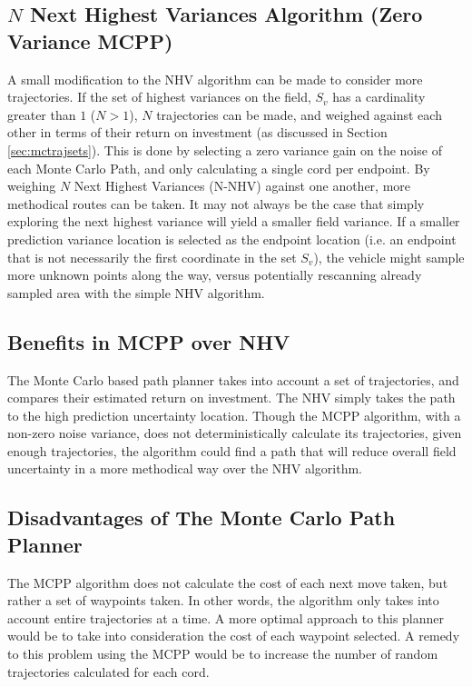 \subsection{$N$ Next Highest Variances Algorithm (Zero Variance MCPP)} \label{sec:nnhv}
A small modification to the NHV algorithm can be made to consider more trajectories. If the set of highest variances on the field, $S_v$ has a cardinality greater than $1$ ($N > 1$), $N$ trajectories can be made, and weighed against each other in terms of their return on investment (as discussed in Section \ref{sec:mctrajsets}). This is done by selecting a zero variance gain on the noise of each Monte Carlo Path, and only calculating a single cord per endpoint. By weighing $N$ Next Highest Variances (N-NHV) against one another, more methodical routes can be taken. It may not always be the case that simply exploring the next highest variance will yield a smaller field variance. If a smaller prediction variance location is selected as the endpoint location (i.e. an endpoint that is not necessarily the first coordinate in the set $S_v$), the vehicle might sample more unknown points along the way, versus potentially rescanning already sampled area with the simple NHV algorithm.

\subsection{Benefits in MCPP over NHV}
The Monte Carlo based path planner takes into account a set of trajectories, and compares their estimated return on investment. The NHV simply takes the path to the high prediction uncertainty location. Though the MCPP algorithm, with a non-zero noise variance, does not deterministically calculate its trajectories, given enough trajectories, the algorithm could find a path that will reduce overall field uncertainty in a more methodical way over the NHV algorithm.

\subsection{Disadvantages of The Monte Carlo Path Planner}
The MCPP algorithm does not calculate the cost of each next move taken, but rather a set of waypoints taken. In other words, the algorithm only takes into account entire trajectories at a time. A more optimal approach to this planner would be to take into consideration the cost of each waypoint selected. A remedy to this problem using the MCPP would be to increase the number of random trajectories calculated for each cord.

